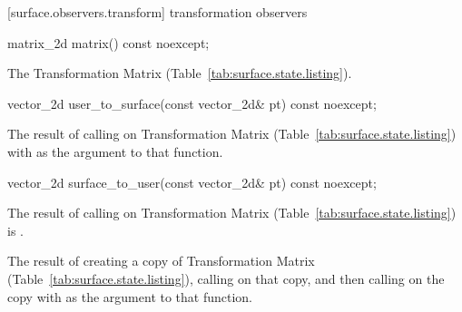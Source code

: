  [surface.observers.transform] { transformation observers}

\begin{itemdecl}
matrix_2d matrix() const noexcept;
\end{itemdecl}
\begin{itemdescr}
\pnum
\returns
The Transformation Matrix (Table~\ref{tab:surface.state.listing}).
\end{itemdescr}

\begin{itemdecl}
vector_2d user_to_surface(const vector_2d& pt) const noexcept;
\end{itemdecl}
\begin{itemdescr}
\pnum
\returns
The result of calling  on Transformation Matrix (Table~\ref{tab:surface.state.listing}) with  as the argument to that function.
\end{itemdescr}

\begin{itemdecl}
vector_2d surface_to_user(const vector_2d& pt) const noexcept;
\end{itemdecl}
\begin{itemdescr}
\pnum
\preconditions
The result of calling  on Transformation Matrix (Table~\ref{tab:surface.state.listing}) is .

\pnum
\returns
The result of creating a copy of Transformation Matrix (Table~\ref{tab:surface.state.listing}), calling  on that copy, and then calling  on the copy with  as the argument to that function.
\end{itemdescr}
